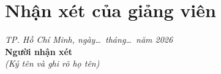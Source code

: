 \chapter*{Nhận xét của giảng viên}
\noindent\dotfill\par\vspace{0.5cm}
\noindent\dotfill\par\vspace{0.5cm}
\noindent\dotfill\par\vspace{0.5cm}
\noindent\dotfill\par\vspace{0.5cm}
\noindent\dotfill\par\vspace{0.5cm}
\noindent\dotfill\par\vspace{0.5cm}
\noindent\dotfill\par\vspace{0.5cm}
\noindent\dotfill\par\vspace{0.5cm}
\noindent\dotfill\par
\vfill
\begin{flushright}
\textit{TP. Hồ Chí Minh, ngày\ldots\ tháng\ldots\ năm 2026}\\[8pt]
\textbf{Người nhận xét}\\[6pt]
\textit{(Ký tên và ghi rõ họ tên)}\hspace{1cm}
\end{flushright}
\vspace{2cm}
\clearpage

